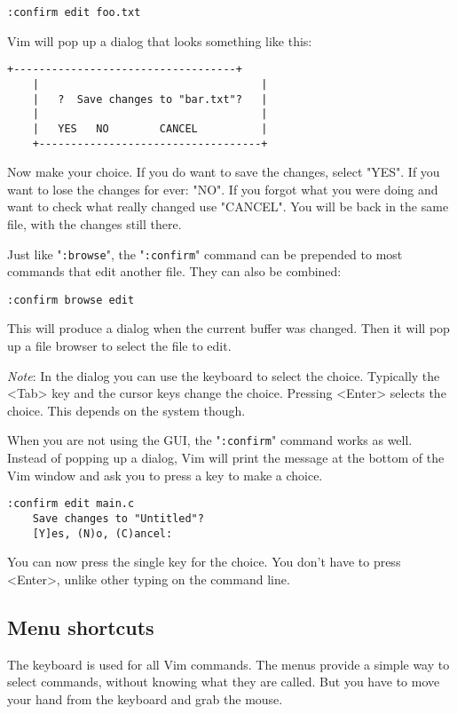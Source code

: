 \begin{Verbatim}[samepage=true]
 :confirm edit foo.txt
\end{Verbatim}

Vim will pop up a dialog that looks something like this:

\begin{Verbatim}[samepage=true]
    +-----------------------------------+
    |                                   |
    |   ?  Save changes to "bar.txt"?   |
    |                                   |
    |   YES   NO        CANCEL          |
    +-----------------------------------+
\end{Verbatim}

Now make your choice.
If you do want to save the changes, select "YES".
If you want to lose the changes for ever: "NO".
If you forgot what you were doing and want to check what really changed use "CANCEL".
You will be back in the same file, with the changes still there.

Just like "\verb!:browse!", the "\verb!:confirm!" command can be prepended to most commands that edit another file.
They can also be combined:

\begin{Verbatim}[samepage=true]
 :confirm browse edit
\end{Verbatim}

This will produce a dialog when the current buffer was changed.
Then it will pop up a file browser to select the file to edit.

\emph{Note}: In the dialog you can use the keyboard to select the choice.
Typically the <Tab> key and the cursor keys change the choice.
Pressing <Enter> selects the choice.
This depends on the system though.

When you are not using the GUI, the "\verb!:confirm!" command works as well.
Instead of popping up a dialog, Vim will print the message at the bottom of the Vim window and ask you to press a key to make a choice.

\begin{Verbatim}[samepage=true]
 :confirm edit main.c
    Save changes to "Untitled"? 
    [Y]es, (N)o, (C)ancel:  
\end{Verbatim}

You can now press the single key for the choice.
You don't have to press <Enter>, unlike other typing on the command line.
\subsection{Menu shortcuts}
The keyboard is used for all Vim commands.
The menus provide a simple way to select commands, without knowing what they are called.
But you have to move your hand from the keyboard and grab the mouse.

